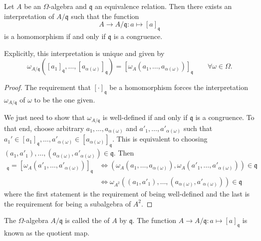 \begin{proposition} \label{quotientAlgebra}
Let $A$ be an $\Omega$-algebra and $\mathfrak{q}$ an equivalence relation. Then there exists an interpretation of $A/\mathfrak{q}$ such that the function
\[ A \to A/\mathfrak{q}: a\mapsto [a]_\mathfrak{q} \]
is a homomorphism if and only if $\mathfrak{q}$ is a congruence.

Explicitly, this interpretation is unique and given by
\[ \omega_{A/\mathfrak{q}}([a_1]_{\mathfrak{q}},\ldots,[a_{\alpha(\omega)}]_{\mathfrak{q}}) = [\omega_A(a_1,\ldots, a_{\alpha(\omega)})]_{\mathfrak{q}} \qquad \forall \omega\in\Omega. \]\end{proposition}
\begin{proof}
The requirement that $[\cdot]_\mathfrak{q}$ be a homomorphism forces the interpretation $\omega_{A/\mathfrak{q}}$ of $\omega$ to be the one given.

We just need to show that $\omega_{A/\mathfrak{q}}$ is well-defined if and only if $\mathfrak{q}$ is a congruence. To that end, choose arbitrary $a_1, \ldots, a_{\alpha(\omega)}$ and $a'_1, \ldots, a'_{\alpha(\omega)}$ such that $a_1'\in[a_1]_\mathfrak{q}, \ldots, a'_{\alpha(\omega)}\in [a_{\alpha(\omega)}]_\mathfrak{q}$. This is equivalent to choosing $(a_1,a'_1),\ldots, (a_{\alpha(\omega)},a'_{\alpha(\omega)}) \in \mathfrak{q}$. Then
\begin{align*}
[\omega_A(a_1,\ldots, a_{\alpha(\omega)})]_{\mathfrak{q}} = [\omega_A(a'_1,\ldots, a'_{\alpha(\omega)})]_{\mathfrak{q}} &\iff (\omega_A(a_1,\ldots, a_{\alpha(\omega)}),\omega_A(a'_1,\ldots, a'_{\alpha(\omega)})) \in \mathfrak{q} \\
&\iff \omega_{A^2}((a_1,a'_1),\ldots, (a_{\alpha(\omega)},a'_{\alpha(\omega)})) \in \mathfrak{q}
\end{align*}
where the first statement is the requirement of being well-defined and the last is the requirement for being a subalgebra of $A^2$.
\end{proof}
\begin{definition}
The $\Omega$-algebra $A/\mathfrak{q}$ is called the  of $A$ by $\mathfrak{q}$. The function $A \to A/\mathfrak{q}: a\mapsto [a]_\mathfrak{q}$ is known as the quotient map.
\end{definition}

